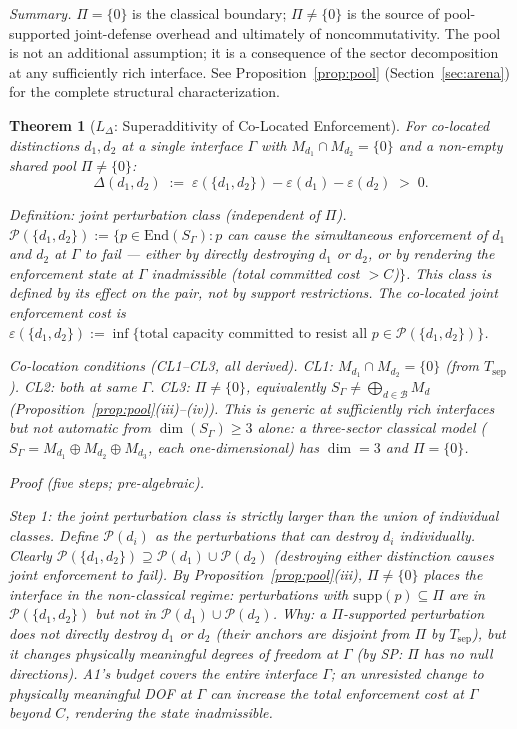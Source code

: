 \documentclass[11pt,a4paper]{article}
\newtheorem{theorem}{Theorem}[section]
\theoremstyle{definition}
\newcommand{\eps}{\varepsilon}
\newcommand{\End}{\mathrm{End}}
\begin{document}
\noindent\textit{Summary.}  $\Pi = \{0\}$ is the classical boundary; $\Pi \ne \{0\}$ is the source of pool-supported joint-defense overhead and ultimately of noncommutativity.  The pool is not an additional assumption; it is a consequence of the sector decomposition at any sufficiently rich interface.  See Proposition~\ref{prop:pool} (Section~\ref{sec:arena}) for the complete structural characterization.

\begin{theorem}[$L_\Delta$: Superadditivity of Co-Located Enforcement]\label{thm:LDelta}
For co-located distinctions $d_1, d_2$ at a single interface $\Gamma$ with $M_{d_1} \cap M_{d_2} = \{0\}$ and a non-empty shared pool $\Pi \ne \{0\}$:
\[
\Delta(d_1, d_2) \;:=\; \eps(\{d_1, d_2\}) - \eps(d_1) - \eps(d_2) \;>\; 0.
\]

\noindent\textit{Definition: joint perturbation class} (independent of $\Pi$).  $\mathcal{P}(\{d_1, d_2\}) := \{p \in \End(S_\Gamma) : p$ can cause the simultaneous enforcement of $d_1$ and $d_2$ at $\Gamma$ to fail --- either by directly destroying $d_1$ or $d_2$, or by rendering the enforcement state at $\Gamma$ inadmissible (total committed cost $> C$)$\}$.  This class is defined by its effect on the pair, not by support restrictions.  The co-located joint enforcement cost is $\eps(\{d_1, d_2\}) := \inf\{\text{total capacity committed to resist all } p \in \mathcal{P}(\{d_1,d_2\})\}$.

\noindent\textit{Co-location conditions} (CL1--CL3, all derived).  CL1: $M_{d_1} \cap M_{d_2} = \{0\}$ (from $T_{\mathrm{sep}}$).  CL2: both at same $\Gamma$.  CL3: $\Pi \ne \{0\}$, equivalently $S_\Gamma \ne \bigoplus_{d \in \mathcal{B}} M_d$ (Proposition~\ref{prop:pool}(iii)--(iv)).  This is generic at sufficiently rich interfaces but not automatic from $\dim(S_\Gamma) \ge 3$ alone: a three-sector classical model ($S_\Gamma = M_{d_1} \oplus M_{d_2} \oplus M_{d_3}$, each one-dimensional) has $\dim = 3$ and $\Pi = \{0\}$.

\smallskip\noindent\textit{Proof} (five steps; pre-algebraic).

\textit{Step 1: the joint perturbation class is strictly larger than the union of individual classes.}
Define $\mathcal{P}(d_i)$ as the perturbations that can destroy $d_i$ individually.  Clearly $\mathcal{P}(\{d_1,d_2\}) \supseteq \mathcal{P}(d_1) \cup \mathcal{P}(d_2)$ (destroying either distinction causes joint enforcement to fail).  By Proposition~\ref{prop:pool}(iii), $\Pi \ne \{0\}$ places the interface in the non-classical regime: perturbations with $\mathrm{supp}(p) \subseteq \Pi$ are in $\mathcal{P}(\{d_1, d_2\})$ but not in $\mathcal{P}(d_1) \cup \mathcal{P}(d_2)$.  \textit{Why:} a $\Pi$-supported perturbation does not directly destroy $d_1$ or $d_2$ (their anchors are disjoint from $\Pi$ by $T_{\mathrm{sep}}$), but it changes physically meaningful degrees of freedom at $\Gamma$ (by SP: $\Pi$ has no null directions).  A1's budget covers the entire interface $\Gamma$; an unresisted change to physically meaningful DOF at $\Gamma$ can increase the total enforcement cost at $\Gamma$ beyond $C$, rendering the state inadmissible.


\end{theorem}
\end{document}
